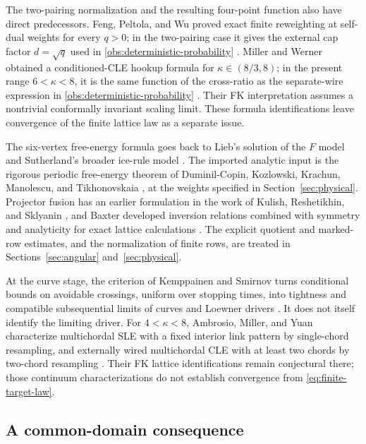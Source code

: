 The two-pairing normalization and the resulting four-point function
also have direct predecessors.  Feng, Peltola, and Wu proved exact
finite reweighting at self-dual weights for every $q>0$; in the
two-pairing case it gives the external cap factor $d=\sqrt q$ used in
\eqref{obs:deterministic-probability}
\cite[Proposition~4.6, equations~(4.17)--(4.19)]{FengPeltolaWu2024FKConnections}.
Miller and Werner obtained a conditioned-CLE hookup formula for
$\kappa\in(8/3,8)$; in the present range $6<\kappa<8$, it is the same
function of the cross-ratio as the separate-wire expression in
\eqref{obs:deterministic-probability}
\cite[Theorem~1, equations~(4.1)--(4.3)]{MillerWerner2018CLEConnections}.
Their FK interpretation assumes a nontrivial conformally invariant
scaling limit.  These formula identifications leave convergence of the
finite lattice law as a separate issue.

The six-vertex free-energy formula goes back to Lieb's solution of the
$F$ model and Sutherland's broader ice-rule model
\cite{Lieb1967FModel,Sutherland1967SixVertex}.  The imported analytic
input is the rigorous periodic free-energy theorem of Duminil-Copin,
Kozlowski, Krachun, Manolescu, and Tikhonovskaia
\cite[Theorem~1]{SixVertex2022}, at the weights specified in
Section~\ref{sec:physical}.  Projector fusion has an earlier formulation
in the work of Kulish, Reshetikhin, and Sklyanin
\cite[Section~2]{KulishReshetikhinSklyanin1981}, and Baxter developed
inversion relations combined with symmetry and analyticity for exact
lattice calculations \cite{Baxter1982Inversion}.  The explicit quotient
and marked-row estimates, and the normalization of finite rows, are
treated in Sections~\ref{sec:angular} and~\ref{sec:physical}.

At the curve stage, the criterion of Kemppainen and Smirnov turns
conditional bounds on avoidable crossings, uniform over stopping times,
into tightness and compatible subsequential limits of curves and Loewner
drivers \cite[Condition~C2, Theorem~1.5, and Corollary~1.7]{KemppainenSmirnov2017}.
It does not itself identify the limiting driver.  For $4<\kappa<8$,
Ambrosio, Miller, and Yuan characterize multichordal SLE with a fixed
interior link pattern by single-chord resampling, and externally wired
multichordal CLE with at least two chords by two-chord resampling
\cite[Theorems~1.3 and~1.6]{AMY2025}.  Their FK lattice identifications
remain conjectural there; those continuum characterizations do not
establish convergence from \eqref{eq:finite-target-law}.

\subsection{A common-domain consequence}

